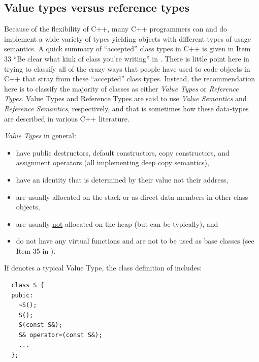 \documentclass[pdf,ps2pdf,11pt]{SANDreport}
\begin{document}
%
{}\subsection{Value types versus reference types}
\label{sec:value-and-reference-types}
%

Because of the flexibility of C++, many C++ programmers can and do
implement a wide variety of types yielding objects with different
types of usage semantics.  A quick summary of ``accepted'' class types
in C++ is given in Item 33 ``Be clear what kink of class you're
writing'' in {}\cite{C++CodingStandards05}.  There is little point
here in trying to classify all of the crazy ways that people have used
to code objects in C++ that stray from these ``accepted'' class types.
Instead, the recommendation here is to classify the majority of
classes as either {}\textit{Value Types} or {}\textit{Reference
Types}.  Value Types and Reference Types are said to use
{}\textit{Value Semantics} and {}\textit{Reference Semantics},
respectively, and that is sometimes how these data-types are described
in various C++ literature.

{}\textit{Value Types} in general:

\begin{itemize}

{}\item have public destructors, default constructors, copy
constructors, and assignment operators (all implementing deep copy
semantics),

{}\item have an identity that is determined by their value not their
address,

{}\item are usually allocated on the stack or as direct data members
in other class objects,

{}\item are usually {}\underline{not} allocated on the heap (but can
be typically), and

{}\item do not have any virtual functions and are not to be used as
base classes (see Item 35 in {}\cite{C++CodingStandards05}).

\end{itemize}

If {} denotes a typical Value Type, the class definition of
{} includes:

{\small\begin{verbatim}
  class S {
  pubic:
    ~S();
    S();
    S(const S&);
    S& operator=(const S&);
    ...
  };
\end{verbatim}}
\end{document}
